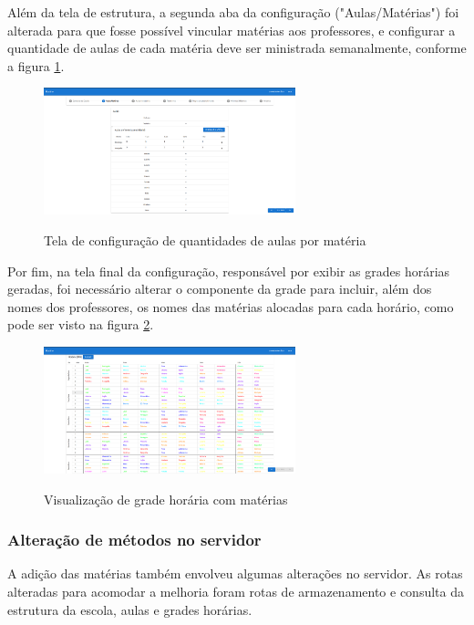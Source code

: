Além da tela de estrutura, a segunda aba da configuração ("Aulas/Matérias") foi alterada para que fosse possível vincular matérias aos professores, e configurar a quantidade de aulas de cada matéria deve ser ministrada semanalmente, conforme a figura \ref{fig:alteracaoAulas}.

\begin{figure}[!htb]
	\centering
	\caption{Tela de configuração de quantidades de aulas por matéria}
	\includegraphics[width=0.65\textwidth]{./dados/figuras/alteracaoAulas}
	\label{fig:alteracaoAulas}
\end{figure}

Por fim, na tela final da configuração, responsável por exibir as grades horárias geradas, foi necessário alterar o componente da grade para incluir, além dos nomes dos professores, os nomes das matérias alocadas para cada horário, como pode ser visto na figura \ref{fig:alteracaoHorario}.

\begin{figure}[!htb]
	\centering
	\caption{Visualização de grade horária com matérias}
	\includegraphics[width=0.65\textwidth]{./dados/figuras/alteracaoHorarios}
	\label{fig:alteracaoHorario}
\end{figure}

\subsubsection{Alteração de métodos no servidor}
A adição das matérias também envolveu algumas alterações no servidor. As rotas alteradas para acomodar a melhoria foram rotas de armazenamento e consulta da estrutura da escola, aulas e grades horárias.

